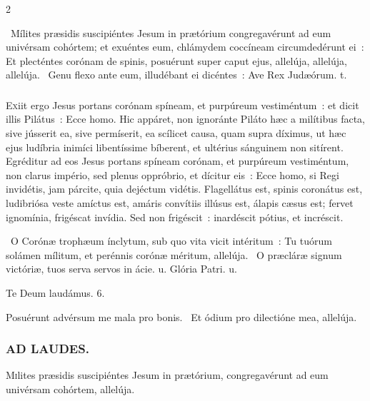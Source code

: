 \documentclass[9pt,twoside]{extarticle}
\begin{document}
\begin{multicols}{2}
{{\begin{tightlist}{}
\item {}~Mílites præsidis suscipiéntes Jesum in prætórium congregavérunt ad eum univérsam cohórtem; et exuéntes eum, chlámydem coccíneam circumdedérunt ei~: \textred{*} Et plecténtes corónam de spinis, posuérunt super caput ejus, allelúja, allelúja, allelúja. ~Genu flexo ante eum, illudébant ei dicéntes~: Ave Rex Judæórum. t.
\end{tightlist}

\subsubsection*{\center {}} 
\lettrine{E}xiit ergo Jesus portans corónam spíneam, et purpúreum vestiméntum~: et dicit illis Pilátus~: Ecce homo. Hic appáret, non ignoránte Piláto hæc a milítibus facta, sive jússerit ea, sive permíserit, ea scílicet causa, quam supra díximus, ut hæc ejus ludíbria inimíci libentíssime bíberent, et ultérius sánguinem non sitírent. Egréditur ad eos Jesus portans spíneam corónam, et purpúreum vestiméntum, non clarus império, sed plenus oppróbrio, et dícitur eis~: Ecce homo, si Regi invidétis, jam párcite, quia dejéctum vidétis. Flagellátus est, spinis coronátus est, ludibriósa veste amíctus est, amáris convítiis illúsus est, álapis cæsus est; fervet ignomínia, frigéscat invídia. Sed non frigéscit~: inardéscit pótius, et incréscit.

\begin{tightlist}{}
\item {}~O Corónæ trophæum ínclytum, sub quo vita vicit intéritum~: \textred{*} Tu tuórum solámen mílitum, et perénnis corónæ méritum, allelúja. ~O præcláræ signum victóriæ, tuos serva servos in ácie. u. Glória Patri. u.
\item Te Deum laudámus. 6.
\item {} Posuérunt advérsum me mala pro bonis. ~Et ódium pro dilectióne mea, allelúja.
\end{tightlist}

\subsubsection*{\center \textsc{AD LAUDES.}}
\begin{center}\end{center}
\lettrine{M}ilites præsidis suscipiéntes Jesum in prætórium, congregavérunt ad eum univérsam cohórtem, allelúja.

}}
\end{multicols}
\end{document}
